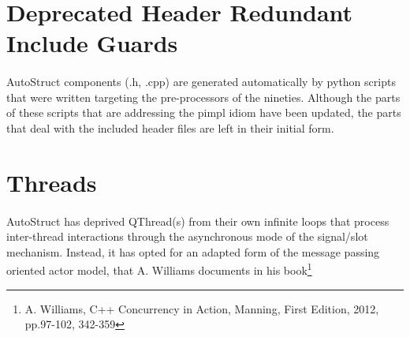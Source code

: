 \section{Deprecated Header Redundant Include Guards}
\paragraph{}
AutoStruct components (.h, .cpp) are generated automatically by python scripts that were written targeting the pre-processors of the nineties. Although the parts of these scripts that are addressing the pimpl idiom have been updated, the parts that deal with the included header files are left in their initial form.
\section{Threads}
\paragraph{}
AutoStruct has deprived QThread(s) from their own infinite loops that process inter-thread interactions through the asynchronous mode of the signal/slot mechanism. Instead, it has opted for an adapted form of the message passing oriented actor model, that A. Williams documents in his book\footnote{A. Williams, C++ Concurrency in Action, Manning, First Edition, 2012, pp.97-102, 342-359}
